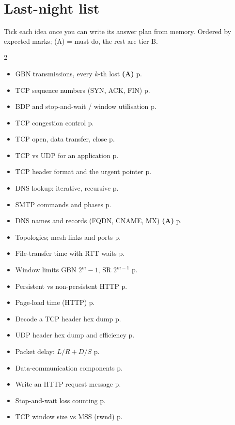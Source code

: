 \section{Last-night list}
Tick each idea once you can write its answer plan from memory. Ordered by expected marks; (A) = must do, the rest are tier B.
\begin{multicols}{2}\footnotesize
\begin{itemize}[label=$\square$,itemsep=1pt]
\item GBN transmissions, every $k$-th lost \textbf{(A)} \dotfill p.~\pageref{iq:C25}
\item TCP sequence numbers (SYN, ACK, FIN) \dotfill p.~\pageref{iq:C29}
\item BDP and stop-and-wait / window utilisation \dotfill p.~\pageref{iq:C23}
\item TCP congestion control \dotfill p.~\pageref{iq:C36}
\item TCP open, data transfer, close \dotfill p.~\pageref{iq:C32}
\item TCP vs UDP for an application \dotfill p.~\pageref{iq:C19}
\item TCP header format and the urgent pointer \dotfill p.~\pageref{iq:C30}
\item DNS lookup: iterative, recursive \dotfill p.~\pageref{iq:C18}
\item SMTP commands and phases \dotfill p.~\pageref{iq:C16}
\item DNS names and records (FQDN, CNAME, MX) \textbf{(A)} \dotfill p.~\pageref{iq:C17}
\item Topologies; mesh links and ports \dotfill p.~\pageref{iq:C05}
\item File-transfer time with RTT waits \dotfill p.~\pageref{iq:C02}
\item Window limits GBN $2^m-1$, SR $2^{m-1}$ \dotfill p.~\pageref{iq:C26}
\item Persistent vs non-persistent HTTP \dotfill p.~\pageref{iq:C11}
\item Page-load time (HTTP) \dotfill p.~\pageref{iq:C12}
\item Decode a TCP header hex dump \dotfill p.~\pageref{iq:C31}
\item UDP header hex dump and efficiency \dotfill p.~\pageref{iq:C28}
\item Packet delay: $L/R+D/S$ \dotfill p.~\pageref{iq:C01}
\item Data-communication components \dotfill p.~\pageref{iq:C04}
\item Write an HTTP request message \dotfill p.~\pageref{iq:C13}
\item Stop-and-wait loss counting \dotfill p.~\pageref{iq:C24}
\item TCP window size vs MSS (rwnd) \dotfill p.~\pageref{iq:C35}
\end{itemize}
\end{multicols}
